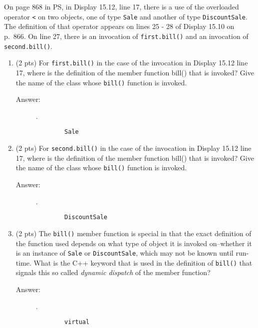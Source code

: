 \documentclass[11pt]{article}
\begin{document}
\section{}
\label{sec:org1480e3c}

On page 868 in PS, in Display 15.12, line 17, there is a use of the
overloaded operator \texttt{<} on two objects, one of type \texttt{Sale} and another
of type \texttt{DiscountSale}. The definition of that operator appears on lines
25 - 28 of Display 15.10 on p. 866. On line 27, there is an invocation
of \texttt{first.bill()} and an invocation of \texttt{second.bill()}.

\begin{enumerate}
\item (2 pts) For \texttt{first.bill()} in the case of the invocation in Display 15.12
line 17, where is the definition of the member function bill() that is
invoked? Give the name of the class whose \texttt{bill()} function is invoked.

\begin{description}
    \item[Answer:] .\\
    \begin{verbatim}
        Sale
    \end{verbatim}
\end{description}

\item (2 pts) For \texttt{second.bill()} in the case of the invocation in Display 15.12
line 17, where is the definition of the member function bill() that is
invoked? Give the name of the class whose \texttt{bill()} function is invoked.

\begin{description}
    \item[Answer:] .\\
    \begin{verbatim}
        DiscountSale
    \end{verbatim}
\end{description}

\item (2 pts) The \texttt{bill()} member function is special in that the exact definition
of the function used depends on what type of object it is invoked on--whether
it is an instance of \texttt{Sale} or \texttt{DiscountSale}, which may not be known until
run-time. What is the C++ keyword that is used in the definition of \texttt{bill()}
that signals this so called \emph{dynamic dispatch} of the member function?

\begin{description}
    \item[Answer:] .\\
    \begin{verbatim}
        virtual
    \end{verbatim}
\end{description}

\end{enumerate}
\end{document}
